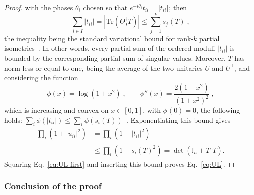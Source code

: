 \documentclass[prx,twocolumn,superscriptaddress,aps,10pt, frontmatterverbose, reprint,footinbib,longbibliography=true]{revtex4-2}
\newcommand{\trans}{\mathsf{T}}
\begin{document}
\begin{proof}
with the phases $\theta_i$ chosen so that $e^{-i\theta_i}t_{ii}=|t_{ii}|$; then
\begin{equation}
    \sum_{i\in I}|t_{ii}|=\left|\mathrm{Tr}(\Theta_I^\dagger T)\right|\le\sum_{j=1}^ks_j(T)\;,
\end{equation} 
the inequality being the standard variational bound for rank-$k$ partial isometries~\cite{bhatia2013matrix}. In other words, every partial sum of the ordered moduli $|t_{ii}|$ is bounded by the corresponding partial sum of singular values. Moreover, $T$ has norm less or equal to one, being the average of the two unitaries $U$ and $U^{\trans}$, and considering the function
\begin{equation}
    \phi(x)=\log(1+x^2)\;,\qquad \phi''(x)=\frac{2(1-x^2)}{(1+x^2)^2}\;,
\end{equation}
which is increasing and convex on $x \in[0,1]$, with $\phi(0)=0$, the following holds: $\sum_i\phi(|t_{ii}|)\le\sum_i\phi(s_i(T))$~\cite{bhatia2013matrix}. Exponentiating this bound gives
\begin{equation}
\begin{split}
\prod_i\left(1+|u_{ii}|^2\right)&=\prod_i\left(1+|t_{ii}|^2\right)\\&\le\prod_i\left(1+s_i(T)^2\right)=\det(\mathbb{I}_n+T^\dagger T).\end{split}
\end{equation} 
Squaring Eq.~\eqref{eq:UL-first} and inserting this bound proves Eq.~\eqref{eq:UL}.
\end{proof}

\subsubsection{Conclusion of the proof}
\label{app:proof:completion}
\end{document}
